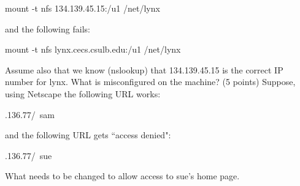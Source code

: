 {\program
 mount -t nfs  134.139.45.15:/u1 /net/lynx
\endprogram}

and the following fails:

{\program
 mount -t nfs  lynx.cecs.csulb.edu:/u1 /net/lynx
\endprogram}

Assume also that we know (nslookup) that {\ltt{}134.139.45.15} is the
correct IP number for lynx.
What is misconfigured on the machine?
\vskip 1.1in
\ques
(5 points)
Suppose, using Netscape the following URL works:

{.136.77/~sam
\endprogram}

and the following URL gets ``access denied":

{.136.77/~sue
\endprogram}

What needs to be changed to allow access to sue's home page.

\bye
